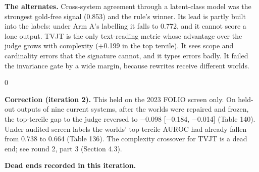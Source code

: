 \documentclass[11pt,letterpaper]{article}
\newenvironment{correction}{\par\medskip\noindent\begin{minipage}{\linewidth}\setlength{\fboxsep}{6pt}\begin{lrbox}{0}\begin{minipage}{0.96\linewidth}\small}{\end{minipage}\end{lrbox}\colorbox{black!6}{\usebox{0}}\end{minipage}\par\medskip}
\begin{document}
\textbf{The alternates.} Cross-system agreement through a latent-class model was the strongest gold-free signal (0.853) and the rule's winner. Its lead is partly built into the labels: under Arm A's labelling it falls to 0.772, and it cannot score a lone output. TVJT is the only text-reading metric whose advantage over the judge grows with complexity (+0.199 in the top tercile). It sees scope and cardinality errors that the signature cannot, and it types errors badly. It failed the invariance gate by a wide margin, because rewrites receive different worlds.

\begin{correction}\textbf{Correction (iteration 2).} This held on the 2023 FOLIO screen only. On held-out outputs of nine current systems, after the worlds were repaired and frozen, the top-tercile gap to the judge reversed to $-$0.098 [$-$0.184, $-$0.014] (Table 140). Under audited screen labels the worlds' top-tercile AUROC had already fallen from 0.738 to 0.664 (Table 136). The complexity crossover for TVJT is a dead end; see round 2, part 3 (Section 4.3).\end{correction}

\textbf{Dead ends recorded in this iteration.}
\end{document}
